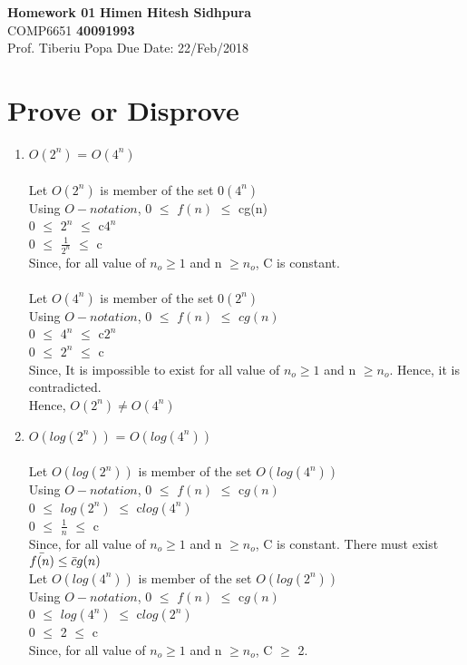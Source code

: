 \documentclass{article}
\begin{document}
\noindent
\large\textbf{Homework 01} \hfill \textbf{Himen Hitesh Sidhpura} \\
\normalsize COMP6651 \hfill \textbf{40091993} \\
Prof. Tiberiu Popa \hfill Due Date: 22/Feb/2018 \\

\section{Prove or Disprove}
\begin{enumerate}
    \item $O(2^n)$  =  $O(4^n)$ \\ \\
    Let $O(2^n)$ is member of the set  $0(4^n)$ \\
    Using $O-notation$, 0 $\leq$  $f(n)$ $\leq$ cg(n) \\
    0 $\leq$  $2^n$ $\leq$ c$4^n$ \\
    0 $\leq$ $\frac{1}{2^n}$ $\leq$ c \\
    Since, for all value  of $n_o \geq  1$ and n $\geq n_o$, C is constant.\\\\
    Let $O(4^n)$ is member of the set  $0(2^n)$ \\
    Using $O-notation$, 0 $\leq$  $f(n)$ $\leq$ $cg(n)$ \\
    0 $\leq$ $4^n$  $\leq$ c$2^n$ \\
    0 $\leq$ $2^n$ $\leq$ c \\
    Since, It is impossible to exist for all value  of $n_o \geq  1$ and n $\geq n_o$. Hence, it is contradicted.\\
    Hence, $O(2^n) \neq O(4^n)$ \\
    \item $O(log{}(2^n))$  =  $O(log{}(4^n))$ \\\\
    Let $O(log{}(2^n))$ is member of the set  $O(log{}(4^n))$ \\
    Using $O-notation$, 0 $\leq$  $f(n)$ $\leq$ c$g(n)$ \\
    0 $\leq$  $log{}(2^n)$ $\leq$ c$log{}(4^n)$ \\
    0 $\leq$ $\frac{1}{n}$ $\leq$ c \\
    Since, for all value  of $n_o \geq  1$ and n $\geq n_o$, C is constant. There must exist $\Bar{f(n)} \leq \Bar{c}g(n)$ \\
    
    Let $O(log{}(4^n))$ is member of the set  $O(log{}(2^n))$ \\
    Using $O-notation$, 0 $\leq$  $f(n)$ $\leq$ c$g(n)$ \\
    0 $\leq$ $log{}(4^n)$  $\leq$ c$log{}(2^n)$ \\
    0 $\leq$ 2 $\leq$ c \\
    Since, for all value  of $n_o \geq  1$ and n $\geq n_o$, C $\geq$ 2.\\
    

\end{enumerate}
\end{document}
